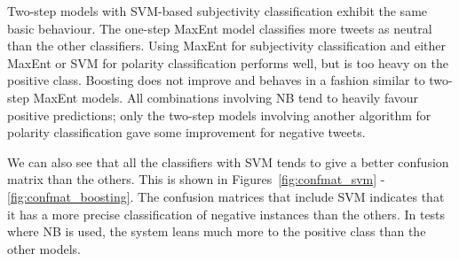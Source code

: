 Two-step models with SVM-based subjectivity classification exhibit the same basic behaviour. The one-step MaxEnt model classifies more tweets as neutral than the other classifiers. Using MaxEnt for subjectivity classification and either MaxEnt or SVM for polarity classification performs well, but is too heavy on the positive class. Boosting does not improve and behaves in a fashion similar to two-step MaxEnt models. All combinations involving NB tend to heavily favour positive predictions; only the two-step models involving another algorithm for polarity classification gave some improvement for negative tweets.

We can also see that all the classifiers with SVM tends to give a better confusion matrix than the others. This is shown in Figures~\ref{fig:confmat_svm} - \ref{fig:confmat_boosting}. The confusion matrices that include SVM indicates that it has a more precise classification of negative instances than the others. In tests where NB is used, the system leans much more to the positive class than the other models.

